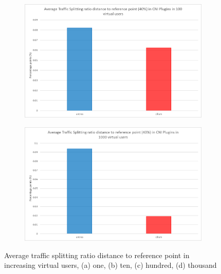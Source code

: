 \begin{figure}[H]
    \begin{subfigure}[b]{0.49\textwidth}
        \includegraphics[width=\textwidth]{plots/traffic-splitting/time_window_5_100vu_reference_cloud.png}
        \label{fig:reference_100vu}
        \caption{}
    \end{subfigure}
    \begin{subfigure}[b]{0.49\textwidth}
        \includegraphics[width=\textwidth]{plots/traffic-splitting/time_window_5_1000vu_reference_cloud.png}
        \label{fig:reference_1000vu}
        \caption{}
    \end{subfigure}

    \caption{Average traffic splitting ratio distance to reference point in increasing virtual users, (a) one, (b) ten, (c) hundred, (d) thousand }
    \label{fig:referencesIngress}
\end{figure}
